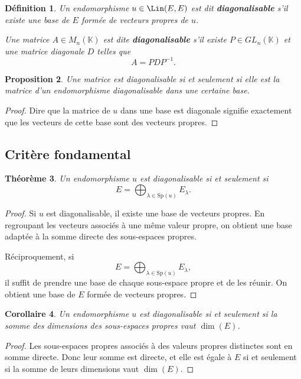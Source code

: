 \documentclass[11pt,a4paper]{article}
\newtheorem{definition}{Définition}[section]
\newtheorem{theoreme}[definition]{Théorème}
\newtheorem{proposition}[definition]{Proposition}
\newtheorem{corollaire}[definition]{Corollaire}
\theoremstyle{remark}
\newcommand{\K}{\mathbb{K}}
\newcommand{\Sp}{\mathrm{Sp}}
\begin{document}
\begin{definition}
Un endomorphisme \(u\in\Lin(E,E)\) est dit \textbf{diagonalisable} s’il existe une base de \(E\) formée de vecteurs propres de \(u\).

Une matrice \(A\in M_n(\K)\) est dite \textbf{diagonalisable} s’il existe \(P\in GL_n(\K)\) et une matrice diagonale \(D\) telles que
\[
A=PDP^{-1}.
\]
\end{definition}

\begin{proposition}
Une matrice est diagonalisable si et seulement si elle est la matrice d’un endomorphisme diagonalisable dans une certaine base.
\end{proposition}

\begin{proof}
Dire que la matrice de \(u\) dans une base est diagonale signifie exactement que les vecteurs de cette base sont des vecteurs propres.
\end{proof}

\subsection{Critère fondamental}

\begin{theoreme}
Un endomorphisme \(u\) est diagonalisable si et seulement si
\[
E=\bigoplus_{\lambda\in\Sp(u)} E_\lambda.
\]
\end{theoreme}

\begin{proof}
Si \(u\) est diagonalisable, il existe une base de vecteurs propres. En regroupant les vecteurs associés à une même valeur propre, on obtient une base adaptée à la somme directe des sous-espaces propres.

Réciproquement, si
\[
E=\bigoplus_{\lambda\in\Sp(u)} E_\lambda,
\]
il suffit de prendre une base de chaque sous-espace propre et de les réunir. On obtient une base de \(E\) formée de vecteurs propres.
\end{proof}

\begin{corollaire}
Un endomorphisme \(u\) est diagonalisable si et seulement si la somme des dimensions des sous-espaces propres vaut \(\dim(E)\).
\end{corollaire}

\begin{proof}
Les sous-espaces propres associés à des valeurs propres distinctes sont en somme directe. Donc leur somme est directe, et elle est égale à \(E\) si et seulement si la somme de leurs dimensions vaut \(\dim(E)\).
\end{proof}
\end{document}
